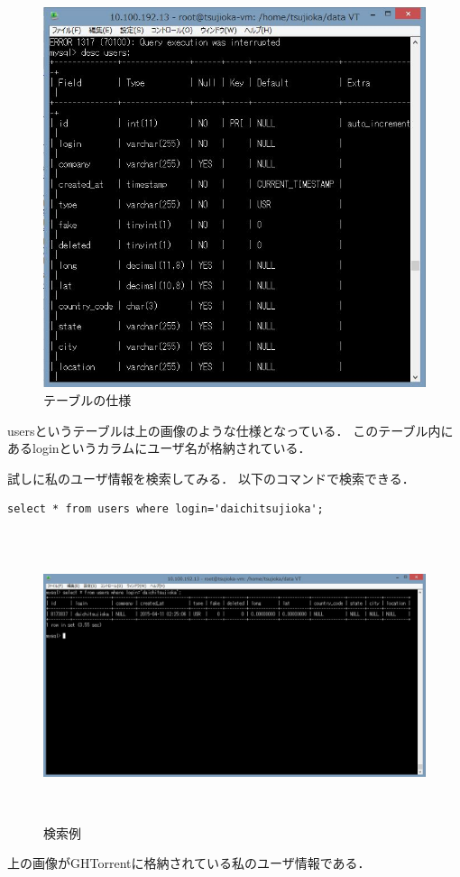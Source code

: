 \begin{figure}[htb]
\centering
\includegraphics[width=12cm]{descusers.JPG}
\caption{テーブルの仕様}\label{サンプル図}
\end{figure}
usersというテーブルは上の画像のような仕様となっている．
このテーブル内にあるloginというカラムにユーザ名が格納されている．

\newpage

試しに私のユーザ情報を検索してみる．
以下のコマンドで検索できる．
\begin{lstlisting}[basicstyle=\ttfamily\footnotesize, frame=single]
select * from users where login='daichitsujioka';
\end{lstlisting}

\begin{figure}[htb]
\centering
\includegraphics[height=8.5cm,width=13cm]{example.JPG}
\caption{検索例}\label{サンプル図}
\end{figure}
上の画像がGHTorrentに格納されている私のユーザ情報である．


